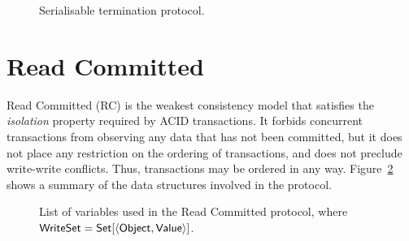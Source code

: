 \begin{figure}[h]
\begin{algorithm}[H]
  \smallskip

\end{algorithm}
\caption{Serialisable termination protocol.}
\label{fig:ser_termination}
\end{figure}

\clearpage

\section{Read Committed}
\label{appendix:rc}

Read Committed (RC) is the weakest consistency model that satisfies the \emph{isolation} property required by ACID transactions. It forbids concurrent transactions from observing any data that has not been committed, but it does not place any restriction on the ordering of transactions, and does not preclude write-write conflicts. Thus, transactions may be ordered in any way. Figure~\ref{fig:rc-prot-ds-table} shows a summary of the data structures involved in the protocol.

\begin{figure}[h]
\noindent{}
\caption{List of variables used in the Read Committed protocol, where ${\sf WriteSet} = {\sf Set}[\langle {\sf Object}, {\sf Value} \rangle]$.}
\label{fig:rc-prot-ds-table}
\end{figure}

